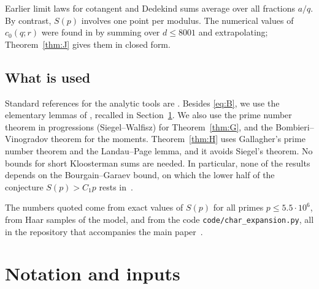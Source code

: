 \documentclass[11pt]{amsart}
\theoremstyle{remark}
\begin{document}
Earlier limit laws for cotangent and Dedekind sums \cite{Vardi,BD} average over all fractions $a/q$. By contrast, $S(p)$ involves one point per modulus. The numerical values of $c_0(q;r)$ were found in \cite{TS} by summing over $d\le8001$ and extrapolating; Theorem~\ref{thm:J} gives them in closed form.

\subsection*{What is used}
Standard references for the analytic tools are \cite{Dav,MV}. Besides \eqref{eq:B}, we use the elementary lemmas of \cite[Sections~4 and~9]{TS}, recalled in Section~\ref{sec:inputs}. We also use the prime number theorem in progressions (Siegel--Walfisz) for Theorem~\ref{thm:G}, and the Bombieri--Vinogradov theorem for the moments. Theorem~\ref{thm:H} uses Gallagher's prime number theorem and the Landau--Page lemma, and it avoids Siegel's theorem. No bounds for short Kloosterman sums are needed. In particular, none of the results depends on the Bourgain--Garaev bound, on which the lower half of the conjecture $S(p)>C_1p$ rests in~\cite{TS}.

The numbers quoted come from exact values of $S(p)$ for all primes $p\le5.5\cdot10^6$, from Haar samples of the model, and from the code \texttt{code/char\_expansion.py}, all in the repository that accompanies the main paper~\cite{TS}.

\section{Notation and inputs}\label{sec:inputs}
\end{document}
